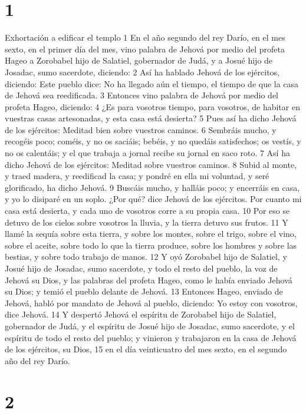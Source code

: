 
\chapter{1}

Exhortación a edificar el templo
1 En el año segundo del rey Darío, en el mes sexto, en el primer día del mes, vino palabra de Jehová por medio del profeta Hageo a Zorobabel hijo de Salatiel, gobernador de Judá, y a Josué hijo de Josadac, sumo sacerdote, diciendo:
2 Así ha hablado Jehová de los ejércitos, diciendo: Este pueblo dice: No ha llegado aún el tiempo, el tiempo de que la casa de Jehová sea reedificada.
3 Entonces vino palabra de Jehová por medio del profeta Hageo, diciendo:
4 ¿Es para vosotros tiempo, para vosotros, de habitar en vuestras casas artesonadas, y esta casa está desierta?
5 Pues así ha dicho Jehová de los ejércitos: Meditad bien sobre vuestros caminos.
6 Sembráis mucho, y recogéis poco; coméis, y no os saciáis; bebéis, y no quedáis satisfechos; os vestís, y no os calentáis; y el que trabaja a jornal recibe su jornal en saco roto.
7 Así ha dicho Jehová de los ejércitos: Meditad sobre vuestros caminos.
8 Subid al monte, y traed madera, y reedificad la casa; y pondré en ella mi voluntad, y seré glorificado, ha dicho Jehová.
9 Buscáis mucho, y halláis poco; y encerráis en casa, y yo lo disiparé en un soplo. ¿Por qué? dice Jehová de los ejércitos. Por cuanto mi casa está desierta, y cada uno de vosotros corre a su propia casa.
10 Por eso se detuvo de los cielos sobre vosotros la lluvia, y la tierra detuvo sus frutos.
11 Y llamé la sequía sobre esta tierra, y sobre los montes, sobre el trigo, sobre el vino, sobre el aceite, sobre todo lo que la tierra produce, sobre los hombres y sobre las bestias, y sobre todo trabajo de manos.
12 Y oyó Zorobabel hijo de Salatiel, y Josué hijo de Josadac, sumo sacerdote, y todo el resto del pueblo, la voz de Jehová su Dios, y las palabras del profeta Hageo, como le había enviado Jehová su Dios; y temió el pueblo delante de Jehová.
13 Entonces Hageo, enviado de Jehová, habló por mandato de Jehová al pueblo, diciendo: Yo estoy con vosotros, dice Jehová.
14 Y despertó Jehová el espíritu de Zorobabel hijo de Salatiel, gobernador de Judá, y el espíritu de Josué hijo de Josadac, sumo sacerdote, y el espíritu de todo el resto del pueblo; y vinieron y trabajaron en la casa de Jehová de los ejércitos, su Dios,
15 en el día veinticuatro del mes sexto, en el segundo año del rey Darío.

\chapter{2}


